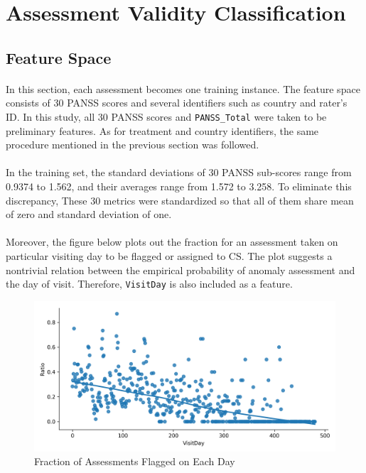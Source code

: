 \documentclass[11pt]{article}
\begin{document}
	\section{Assessment Validity Classification}
	\subsection{Feature Space}
	\paragraph{} In this section, each assessment becomes one training instance. The feature space consists of 30 PANSS scores and several identifiers such as country and rater's ID. In this study, all 30 PANSS scores and \texttt{PANSS\_Total} were taken to be preliminary features. As for treatment and country identifiers, the same procedure mentioned in the previous section was followed.
	\paragraph{} In the training set, the standard deviations of 30 PANSS sub-scores range from 0.9374 to 1.562, and their averages range from 1.572 to 3.258. To eliminate this discrepancy, These 30 metrics were standardized so that all of them share mean of zero and standard deviation of one.
	\paragraph{} Moreover, the figure below plots out the fraction for an assessment taken on particular visiting day to be flagged or assigned to CS. The plot suggests a nontrivial relation between the empirical probability of anomaly assessment and the day of visit. Therefore, \texttt{VisitDay} is also included as a feature.
	\begin{figure}[H]
		\centering
		\includegraphics[width=0.7\linewidth]{figures/alert_ratio_days.png}
		\caption{Fraction of Assessments Flagged on Each Day}
	\end{figure}
	
\end{document}
